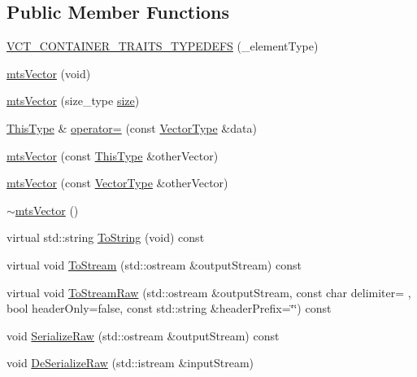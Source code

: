 \subsection*{Public Member Functions}
\begin{DoxyCompactItemize}
\item 
\hyperlink{classmts_vector_a1a58641b9a6be36ef053853a4f17b2be}{V\+C\+T\+\_\+\+C\+O\+N\+T\+A\+I\+N\+E\+R\+\_\+\+T\+R\+A\+I\+T\+S\+\_\+\+T\+Y\+P\+E\+D\+E\+F\+S} (\+\_\+element\+Type)
\item 
\hyperlink{classmts_vector_a87a79f0e97df96765fa393b08c23817c}{mts\+Vector} (void)
\item 
\hyperlink{classmts_vector_a2316fe5ddd0c535f306c115cf84fe08f}{mts\+Vector} (size\+\_\+type \hyperlink{classvct_dynamic_const_vector_base_a79950d8cced7fd4e790d9ac2ca1c43a7}{size})
\item 
\hyperlink{classvct_dynamic_const_vector_base_a39da273523717f678f54d3321ebca3dd}{This\+Type} \& \hyperlink{classmts_vector_a66509e4463a281ecfe252236872d2835}{operator=} (const \hyperlink{classmts_vector_a49432bef14e2c0e3d4d9786d4e1093c7}{Vector\+Type} \&data)
\item 
\hyperlink{classmts_vector_ac0b3eaab70c823b6c1402b2ec3941f53}{mts\+Vector} (const \hyperlink{classvct_dynamic_const_vector_base_a39da273523717f678f54d3321ebca3dd}{This\+Type} \&other\+Vector)
\item 
\hyperlink{classmts_vector_a3dd3d96f8241bf032dfeafd7f939fd86}{mts\+Vector} (const \hyperlink{classmts_vector_a49432bef14e2c0e3d4d9786d4e1093c7}{Vector\+Type} \&other\+Vector)
\item 
\hyperlink{classmts_vector_a3c2d2ded1f98025ef7e4a39b500431fc}{$\sim$mts\+Vector} ()
\item 
virtual std\+::string \hyperlink{classmts_vector_ae5e936e57683f889249d877790b7dd22}{To\+String} (void) const 
\item 
virtual void \hyperlink{classmts_vector_a38a18c371b6e20b7fd4534e42d2cfe59}{To\+Stream} (std\+::ostream \&output\+Stream) const 
\item 
virtual void \hyperlink{classmts_vector_a4893fa7e69f3b9307cdb96f937852151}{To\+Stream\+Raw} (std\+::ostream \&output\+Stream, const char delimiter= \textquotesingle{} \textquotesingle{}, bool header\+Only=false, const std\+::string \&header\+Prefix=\char`\"{}\char`\"{}) const 
\item 
void \hyperlink{classmts_vector_a4e794f0bba29de4e6f09009f167d2916}{Serialize\+Raw} (std\+::ostream \&output\+Stream) const 
\item 
void \hyperlink{classmts_vector_aed1e6de9cc166814be483f3bfb468724}{De\+Serialize\+Raw} (std\+::istream \&input\+Stream)
\end{DoxyCompactItemize}
